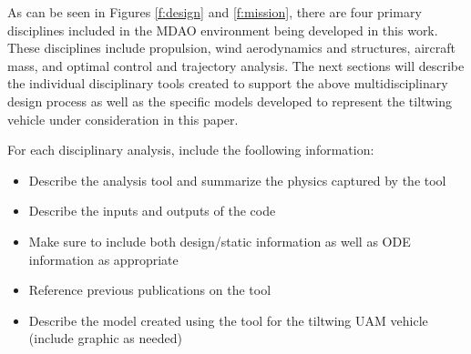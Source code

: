 As can be seen in Figures \ref{f:design} and \ref{f:mission}, there are four primary disciplines included in the MDAO environment being developed in this work.  
These disciplines include propulsion, wind aerodynamics and structures, aircraft mass, and optimal control and trajectory analysis.
The next sections will describe the individual disciplinary tools created to support the above multidisciplinary design process as well as the specific models developed to represent the tiltwing vehicle under consideration in this paper.





For each disciplinary analysis, include the foollowing information:
\begin{itemize}
    \item Describe the analysis tool and summarize the physics captured by the tool
    \item Describe the inputs and outputs of the code
    \item Make sure to include both design/static information as well as ODE information as appropriate
    \item Reference previous publications on the tool
    \item Describe the model created using the tool for the tiltwing UAM vehicle (include graphic as needed)
\end{itemize}

